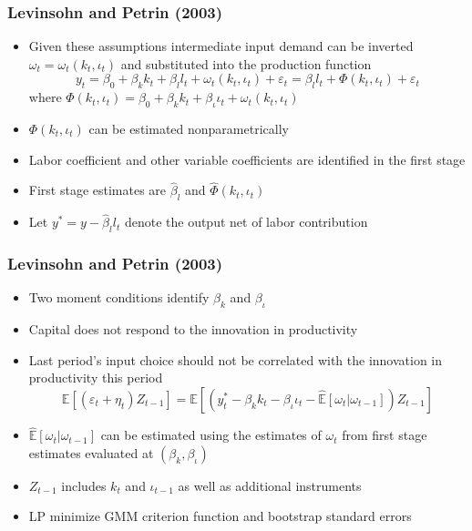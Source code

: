 \documentclass{beamer}
\begin{document}
\begin{frame}
\frametitle{Levinsohn and Petrin (2003)}
\begin{itemize}
	\item Given these assumptions intermediate input demand can be inverted $\omega_{t}=\omega_{t}(k_{t}, \iota_{t})$ and substituted into the production function
	\begin{equation}
		y_{t}=\beta_{0}+\beta_{k}k_{t}+\beta_{l}l_{t}+\omega_{t}(k_{t}, \iota_{t})+\varepsilon_{t}=\beta_{l}l_{t}+\Phi(k_{t}, \iota_{t})+\varepsilon_{t}
	\end{equation}
	where $\Phi(k_{t}, \iota_{t})=\beta_{0}+\beta_{k}k_{t}+\beta_{\iota}\iota_{t}+\omega_{t}(k_{t}, \iota_{t})$
	\item $\Phi(k_{t}, \iota_{t})$ can be estimated nonparametrically
	\item Labor coefficient and other variable coefficients are identified in the first stage
	\item First stage estimates are $\hat{\beta}_{l}$ and $\hat{\Phi}(k_{t}, \iota_{t})$ 
	\item Let $y^{*}=y-\hat{\beta}_{l}l_{t}$ denote the output net of labor contribution
\end{itemize}
\end{frame}


\begin{frame}
\frametitle{Levinsohn and Petrin (2003)}
\begin{itemize}
	\item Two moment conditions identify $\beta_{k}$ and $\beta_{\iota}$
	\item Capital does not respond to the innovation in productivity 
	\item Last period's input choice should not be correlated with the innovation in productivity this period
	\begin{equation}
	\mathbb{E}[(\varepsilon_{t}+\eta_{t})Z_{t-1}]=\mathbb{E}[(y_{t}^{*}-\beta_{k}k_{t}-\beta_{\iota}\iota_{t}-\hat{\mathbb{E}}[\omega_{t}|\omega_{t-1}])Z_{t-1}]
	\end{equation}
	\item $\hat{\mathbb{E}}[\omega_{t}|\omega_{t-1}]$ can be estimated using the estimates of $\omega_{t}$ from first stage estimates evaluated at $(\beta_{k}, \beta_{\iota})$
	\item $Z_{t-1}$ includes $k_{t}$ and $\iota_{t-1}$ as well as additional instruments
	\item LP minimize GMM criterion function and bootstrap standard errors 
\end{itemize}
\end{frame}
\end{document}

